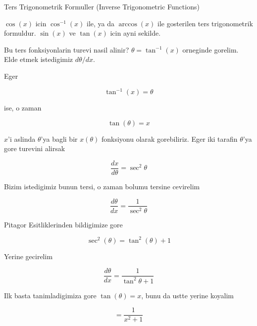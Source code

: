 \documentclass[12pt,fleqn]{article}\usepackage{../common}
\begin{document}
Ters Trigonometrik Formuller (Inverse Trigonometric Functions)

$\cos(x)$ icin $\cos^{-1}(x)$ ile, ya da $\arccos(x)$ ile gosterilen ters
trigonometrik formuldur. $\sin(x)$ ve $\tan(x)$ icin ayni sekilde. 

Bu ters fonksiyonlarin turevi nasil alinir? $\theta = \tan^{-1}(x)$ orneginde
gorelim. Elde etmek istedigimiz $d\theta/dx$. 

Eger

\[ \tan^{-1}(x) = \theta\]

ise, o zaman 

\[ \tan(\theta) = x \]

$x$'i aslinda $\theta$'ya bagli bir $x(\theta)$ fonksiyonu olarak gorebiliriz. 
Eger iki tarafin $\theta$'ya gore turevini alirsak

\[ \frac{dx}{d\theta} = \sec^{2}\theta \]

Bizim istedigimiz bunun tersi, o zaman bolumu tersine cevirelim

\[ \frac{d\theta}{dx} = \frac{1}{\sec^{2}\theta} \]

Pitagor Esitliklerinden bildigimize gore

\[ \sec^{2}(\theta) = \tan^{2}(\theta) + 1 \]

Yerine gecirelim

\[ \frac{d\theta}{dx} = \frac{1}{\tan^{2}\theta + 1} \]

Ilk basta tanimladigimiza gore $\tan(\theta) = x$, bunu da ustte yerine
koyalim

\[  = \frac{1}{x^2 + 1} \]
\end{document}
